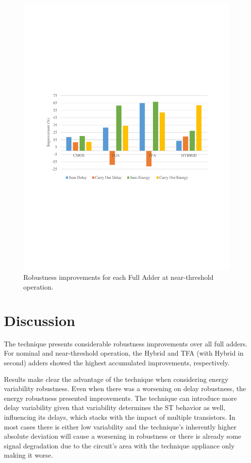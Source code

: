 \documentclass[ecp,tc, english]{iiufrgs}
\begin{document}
\begin{figure}[H]
\centering
\includegraphics[width=\textwidth, trim={0 9.5cm 0 9cm},clip]{improvNT.pdf}
\caption{Robustness improvements for each Full Adder at near-threshold operation.}
\label{fig:Fig42}
\end{figure}

\section{Discussion}
The technique presents considerable robustness improvements over all full adders. For nominal and near-threshold operation, the Hybrid and TFA (with Hybrid in second) adders showed the highest accumulated improvements, respectively.

Results make clear the advantage of the technique when considering energy variability robustness. Even when there was a worsening on delay robustness, the energy robustness presented improvements. The technique can introduce more delay variability given that variability determines the ST behavior as well, influencing its delays, which stacks with the impact of multiple transistors. In most cases there is either low variability and the technique’s inherently higher absolute deviation will cause a worsening in robustness or there is already some signal degradation due to the circuit’s area with the technique appliance only making it worse. 
\end{document}
